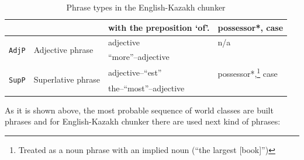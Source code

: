 \documentclass[11pt]{article}
\begin{document}
\begin{savenotes}
\begin{table}
\begin{tabular}{|l|l|l|l|}
                                   &                                   & with the preposition `of'. & possessor*, case \\
    \hline
    \multirow{2}{*}{\texttt{AdjP}} & \multirow{2}{*}{Adjective phrase}  & adjective & n/a \\
                                   &                                    & ``more''--adjective & \\
    \hline
    \multirow{2}{*}{\texttt{SupP}} & \multirow{2}{*}{Superlative phrase} & adjective--``est'' & possessor*,\footnote{Treated as a noun phrase with an implied noun (``the largest [book]'')} case \\
                                   &                                     & the--``most''--adjective & \\ 
    \hline
  \end{tabular}
  \caption{Phrase types in the English-Kazakh chunker}
  \label{table:phrases} 
\end{table}
\end{savenotes}

As it is shown above, the most probable sequence of world classes are built phrases and 
for English-Kazakh chunker there are used next kind of phrases:

\end{document}
